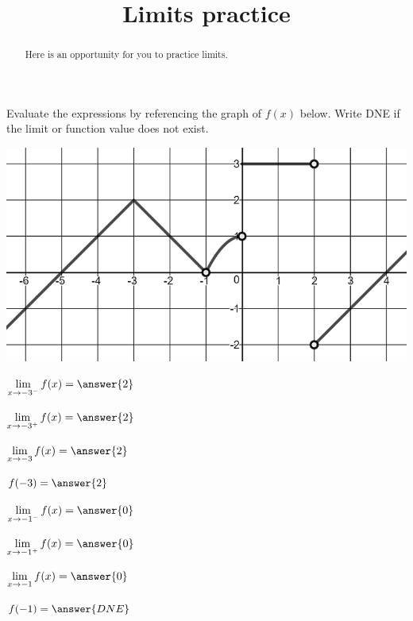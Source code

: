 \documentclass[handout]{ximera}
\title{Limits practice}
\begin{document}
\begin{abstract}
Here is an opportunity for you to practice limits.
\end{abstract}
\maketitle

\begin{exercise}
  Evaluate the expressions by referencing the graph of $f(x)$ below. Write DNE if the limit or function value does not exist.
  
\begin{center} \includegraphics[scale=0.5]{limgraph.png} \end{center}

\begin{enumerate}

\begin{multicols}{3}
\item [] $\displaystyle\lim_{x\to -3^-} f(x) =\answer{2}$  

\item [] $\displaystyle\lim_{x\to -3^+} f(x) = \answer{2}$ 

\item [] $\displaystyle\lim_{x\to -3} f(x) = \answer{2}$ 

\item [] $f(-3) = \answer{2}$

\item [] $\displaystyle\lim_{x\to -1^-} f(x) =\answer{0}$ 

\item [] $\displaystyle\lim_{x\to -1^+} f(x) = \answer{0}$ 

\item [] $\displaystyle\lim_{x\to -1} f(x) = \answer{0}$ 

\item [] $f(-1) = \answer{DNE}$


\end{multicols}
\end{enumerate}
\end{exercise}
\end{document}
